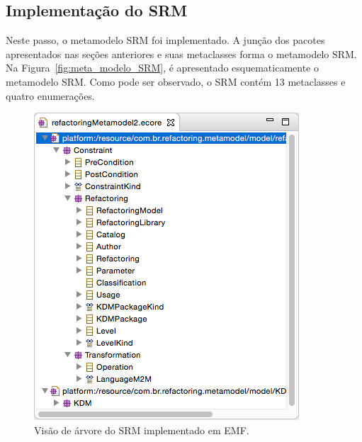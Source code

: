 


\subsection{Implementação do SRM}\label{sec:implementacao_do_SRM}

Neste passo, o metamodelo SRM foi implementado. A junção dos pacotes apresentados nas seções anteriores e suas metaclasses forma o metamodelo SRM. Na Figura~\ref{fig:meta_modelo_SRM}, é apresentado esquematicamente o metamodelo SRM. Como pode ser observado, o SRM contém 13 metaclasses e quatro enumerações. 

\begin{figure}[h]
	\centering
	\caption{Visão de árvore do SRM implementado em EMF.}
	\label{fig:visao_arvore_srm_emf}
	\includegraphics[scale=0.65]{images/srm_emf}
	\fautor
\end{figure}


